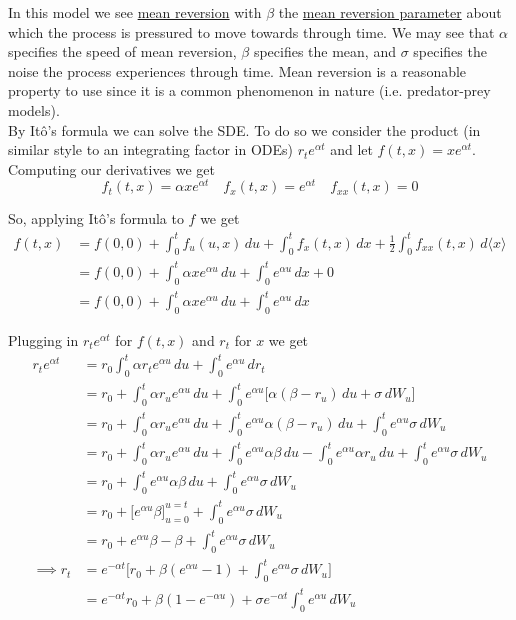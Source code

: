 \documentclass[12pt]{article}
\newlength\tindent
\renewcommand{\indent}{\hspace*{\tindent}}
\begin{document}
\indent In this model we see \underline{mean reversion} with $\beta$ the \underline{mean reversion parameter} about which the process is pressured to move towards through time. We may see that $\alpha$ specifies the speed of mean reversion, $\beta$ specifies the mean, and $\sigma$ specifies the noise the process experiences through time. Mean reversion is a reasonable property to use since it is a common phenomenon in nature (i.e. predator-prey models). \\

\indent By It\^{o}'s formula we can solve the SDE. To do so we consider the product (in similar style to an integrating factor in ODEs) $r_te^{\alpha t}$ and let $f(t,x) = xe^{\alpha t}$. Computing our derivatives we get
\begin{equation*}
	f_t(t,x) = \alpha xe^{\alpha t} \quad f_x(t,x) = e^{\alpha t} \quad f_{xx}(t,x) = 0
\end{equation*}

So, applying It\^{o}'s formula to $f$ we get
\begin{align*}
	f(t,x) &= f(0,0) + \int^t_0 f_u(u,x)\,du + \int^t_0 f_x(t,x)\,dx + \frac{1}{2}\int^t_0 f_{xx}(t,x)\,d\langle x\rangle \\
	&= f(0,0) + \int^t_0 \alpha xe^{\alpha u}\,du + \int^t_0 e^{\alpha u}\,dx + 0 \\
	&= f(0,0) + \int^t_0 \alpha xe^{\alpha u}\,du + \int^t_0 e^{\alpha u}\,dx
\end{align*}

Plugging in $r_te^{\alpha t}$ for $f(t,x)$ and $r_t$ for $x$ we get
\begin{align*}
	r_te^{\alpha t} &= r_0 \int^t_0 \alpha r_te^{\alpha u}\,du + \int^t_0 e^{\alpha u}\,dr_t \\
	&= r_0 + \int^t_0 \alpha r_ue^{\alpha u}\,du + \int^t_0 e^{\alpha u}\big[\alpha(\beta - r_u)\,du + \sigma\,dW_u
\big] \\
	&= r_0 + \int^t_0 \alpha r_ue^{\alpha u}\,du + \int^t_0 e^{\alpha u}\alpha(\beta - r_u)\,du + \int^t_0 e^{\alpha u}\sigma\,dW_u \\
	&= r_0 + \int^t_0 \alpha r_ue^{\alpha u}\,du + \int^t_0 e^{\alpha u}\alpha\beta\,du - \int^t_0 e^{\alpha u}\alpha r_u\,du + \int^t_0 e^{\alpha u}\sigma\,dW_u \\
	&= r_0 + \int^t_0 e^{\alpha u}\alpha\beta\,du + \int^t_0 e^{\alpha u}\sigma\,dW_u \\
	&= r_0 + \Big[e^{\alpha u}\beta\Big]^{u = t}_{u = 0} + \int^t_0 e^{\alpha u}\sigma\,dW_u \\
	&= r_0 + e^{\alpha u}\beta - \beta + \int^t_0 e^{\alpha u}\sigma\,dW_u \\
	\implies r_t &= e^{-\alpha t}\Big[r_0 + \beta(e^{\alpha u} - 1) + \int^t_0 e^{\alpha u}\sigma\,dW_u \Big] \\
	&=  e^{-\alpha t}r_0 + \beta(1 - e^{-\alpha u}) + \sigma e^{-\alpha t}\int^t_0 e^{\alpha u}\,dW_u 
\end{align*}
\end{document}
